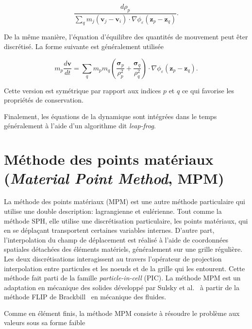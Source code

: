 \begin{equation*}
    \frac{d\rho_p}{\sum_{q} m_j (\bm v_j - \bm v_i) \cdot \nabla \phi_\varepsilon(\bm z_p - \bm z_q)}.
\end{equation*}

De la même manière, l'équation d'équilibre des quantités de mouvement peut êter discrétisé. La forme suivante est généralement utilisée

\begin{equation*}
    m_p \frac{d \bm v}{dt} = \sum_{q} m_p m_q \left(\frac{\bm \sigma_p}{\rho_p^2} + \frac{\bm \sigma_q}{\rho_q^2} \right) \cdot \nabla \phi_\varepsilon(\bm z_p - \bm z_q).
\end{equation*}

Cette version est symétrique par rapport aux indices $p$ et $q$ ce qui favorise les propriétés de conservation.

Finalement, les équations de la dynamique sont intégrées dans le temps généralement à l'aide d'un algorithme dit \textit{leap-frog}.

\section{Méthode des points matériaux (\textit{Material Point Method}, MPM)}

La méthode des points matériaux (MPM) est une autre méthode particulaire qui utilise une double description: lagrangienne et eulérienne. Tout comme la méthode SPH, elle utilise une discrétisation particulaire, les points matériaux, qui en se déplaçant transportent certaines variables internes. D'autre part, l'interpolation du champ de déplacement est réalisé à l'aide de coordonnées spatiales détachées des éléments matériels, généralement sur une grille régulière. Les deux discrétisations interagissent au travers l'opérateur de projection interpolation entre particules et les noeuds et de la grille qui les entourent. Cette méthode fait parti de la famille \textit{particle-in-cell} (PIC). La méthode MPM est un adaptation en mécanique des solides développé par Sulsky et al.~\cite{sulsky_particle_1994} à partir de la méthode FLIP de Brackbill~\cite{brackbill_flip_1988} en mécanique des fluides.

Comme en élément finis, la méthode MPM consiste à résoudre le problème aux valeurs sous sa forme faible

